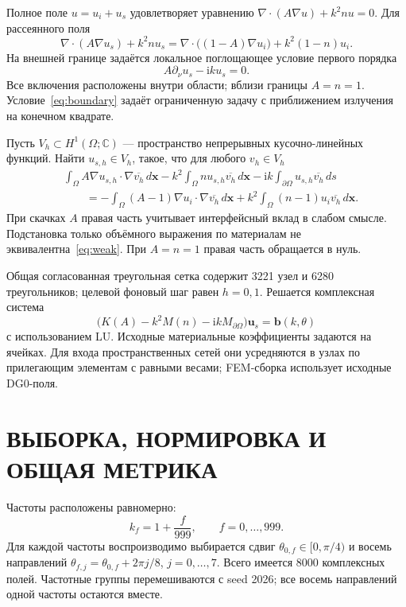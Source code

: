 \documentclass[notitle]{sibjima_preview}
\newcommand{\ii}{\mathrm{i}}
\newcommand{\C}{\mathbb{C}}
\begin{document}
Полное поле \(u=u_i+u_s\) удовлетворяет уравнению \(\nabla\cdot(A\nabla u)+k^2nu=0\). Для рассеянного поля
\begin{equation}
\nabla\cdot(A\nabla u_s)+k^2nu_s
=\nabla\cdot\bigl((1-A)\nabla u_i\bigr)+k^2(1-n)u_i.
\label{eq:helmholtz}
\end{equation}
На внешней границе задаётся локальное поглощающее условие первого порядка
\begin{equation}
A\partial_\nu u_s-\ii ku_s=0.
\label{eq:boundary}
\end{equation}
Все включения расположены внутри области; вблизи границы \(A=n=1\). Условие~\eqref{eq:boundary} задаёт ограниченную задачу с приближением излучения на конечном квадрате.

Пусть \(V_h\subset H^1(\Omega;\C)\) --- пространство непрерывных кусочно-линейных функций. Найти \(u_{s,h}\in V_h\), такое, что для любого \(v_h\in V_h\)
\begin{equation}
\begin{aligned}
&\int_\Omega A\nabla u_{s,h}\cdot\nabla\overline{v_h}\,d\bm x
-k^2\int_\Omega nu_{s,h}\overline{v_h}\,d\bm x
-\ii k\int_{\partial\Omega}u_{s,h}\overline{v_h}\,ds\\
&\qquad=-\int_\Omega(A-1)\nabla u_i\cdot\nabla\overline{v_h}\,d\bm x
+k^2\int_\Omega(n-1)u_i\overline{v_h}\,d\bm x.
\end{aligned}
\label{eq:weak}
\end{equation}
При скачках \(A\) правая часть учитывает интерфейсный вклад в слабом смысле. Подстановка только объёмного выражения по материалам не эквивалентна~\eqref{eq:weak}. При \(A=n=1\) правая часть обращается в нуль.

Общая согласованная треугольная сетка содержит 3221 узел и 6280 треугольников; целевой фоновый шаг равен \(h=0,1\). Решается комплексная система
\begin{equation}
\bigl(K(A)-k^2M(n)-\ii kM_{\partial\Omega}\bigr)\bm u_s=\bm b(k,\theta)
\label{eq:system}
\end{equation}
с использованием LU. Исходные материальные коэффициенты задаются на ячейках. Для входа пространственных сетей они усредняются в узлах по прилегающим элементам с равными весами; FEM-сборка использует исходные DG0-поля.

\section{ВЫБОРКА, НОРМИРОВКА И ОБЩАЯ МЕТРИКА}
Частоты расположены равномерно:
\begin{equation}
k_f=1+\frac{f}{999},\qquad f=0,\ldots,999.
\label{eq:frequencies}
\end{equation}
Для каждой частоты воспроизводимо выбирается сдвиг \(\theta_{0,f}\in[0,\pi/4)\) и восемь направлений
\(\theta_{f,j}=\theta_{0,f}+2\pi j/8\), \(j=0,\ldots,7\). Всего имеется 8000 комплексных полей. Частотные группы перемешиваются с seed 2026; все восемь направлений одной частоты остаются вместе.
\end{document}
